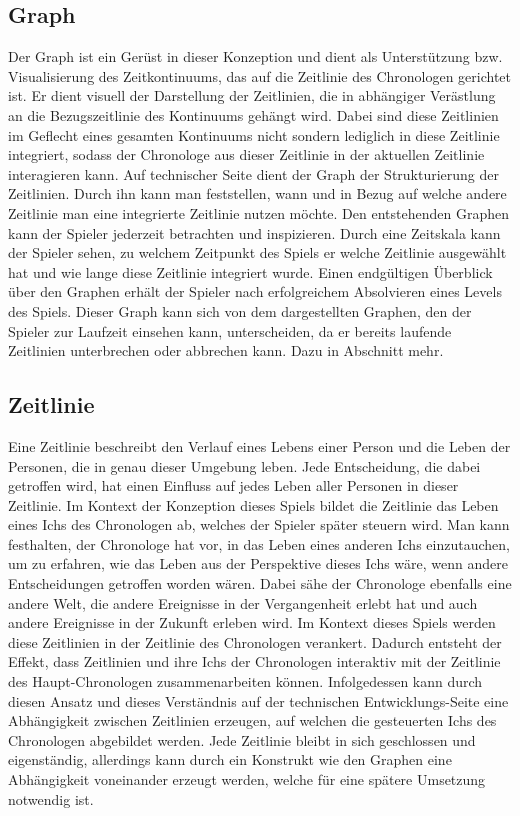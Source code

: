 \subsection{Graph}
Der Graph ist ein Gerüst in dieser Konzeption und dient als Unterstützung bzw. Visualisierung des Zeitkontinuums, das auf die Zeitlinie des Chronologen gerichtet ist. Er dient visuell der Darstellung der  Zeitlinien, die in abhängiger Verästlung an die Bezugszeitlinie des Kontinuums gehängt wird. Dabei sind diese Zeitlinien im Geflecht eines gesamten Kontinuums nicht  sondern lediglich in diese Zeitlinie integriert, sodass der Chronologe aus dieser Zeitlinie in der aktuellen Zeitlinie interagieren kann. Auf technischer Seite dient der Graph der Strukturierung der Zeitlinien. Durch ihn kann man feststellen, wann und in Bezug auf welche andere Zeitlinie man eine integrierte Zeitlinie nutzen möchte. Den entstehenden Graphen kann der Spieler jederzeit betrachten und inspizieren. Durch eine Zeitskala kann der Spieler sehen, zu welchem Zeitpunkt des Spiels er welche Zeitlinie ausgewählt hat und wie lange diese Zeitlinie integriert wurde. Einen endgültigen Überblick über den Graphen erhält der Spieler nach erfolgreichem Absolvieren eines Levels des Spiels. Dieser Graph kann sich von dem dargestellten Graphen, den der Spieler zur Laufzeit einsehen kann, unterscheiden, da er bereits laufende Zeitlinien unterbrechen oder abbrechen kann. Dazu in Abschnitt  mehr.

\subsection{Zeitlinie}
Eine Zeitlinie beschreibt den Verlauf eines Lebens einer Person und die Leben der Personen, die in genau dieser Umgebung leben. Jede Entscheidung, die dabei getroffen wird, hat einen Einfluss auf jedes Leben aller Personen in dieser Zeitlinie. Im Kontext der Konzeption dieses Spiels bildet die Zeitlinie das Leben eines Ichs des Chronologen ab, welches der Spieler später steuern wird. Man kann festhalten, der Chronologe hat vor, in das Leben eines anderen Ichs einzutauchen, um zu erfahren, wie das Leben aus der Perspektive dieses Ichs wäre, wenn andere Entscheidungen getroffen worden wären. Dabei sähe der Chronologe ebenfalls eine andere Welt, die andere Ereignisse in der Vergangenheit erlebt hat und auch andere Ereignisse in der Zukunft erleben wird. Im Kontext dieses Spiels werden diese Zeitlinien in der Zeitlinie des Chronologen verankert. Dadurch entsteht der Effekt, dass Zeitlinien und ihre Ichs der Chronologen interaktiv mit der Zeitlinie des Haupt-Chronologen zusammenarbeiten können. Infolgedessen kann durch diesen Ansatz und dieses Verständnis auf der technischen Entwicklungs-Seite eine Abhängigkeit zwischen Zeitlinien erzeugen, auf welchen die gesteuerten Ichs des Chronologen abgebildet werden. Jede Zeitlinie bleibt in sich geschlossen und eigenständig, allerdings kann durch ein Konstrukt wie den Graphen eine Abhängigkeit voneinander erzeugt werden, welche für eine spätere Umsetzung notwendig ist.

